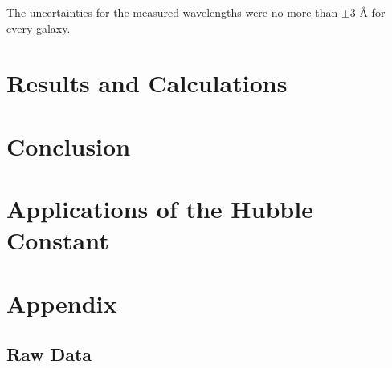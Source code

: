 \documentclass[12pt]{article}
\begin{document}
The uncertainties for the measured wavelengths were no more than $\pm 3$ Å for every galaxy.

\section{Results and Calculations}



\section{Conclusion}



\section{Applications of the Hubble Constant}




\newpage





\newpage

\section*{Appendix}

\subsection*{Raw Data}

\listoffigures
\end{document}
